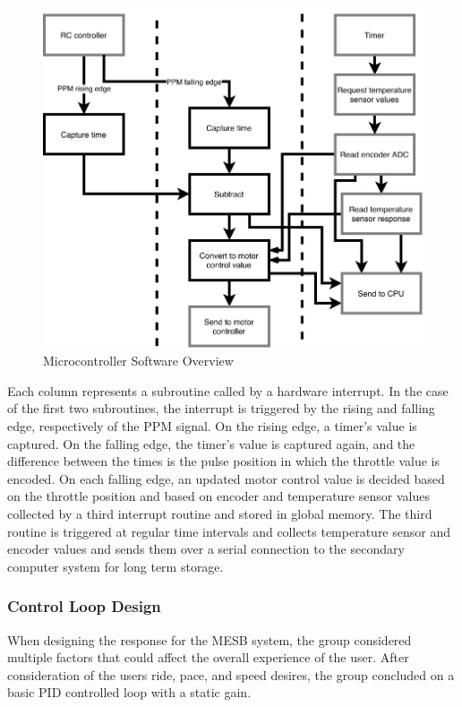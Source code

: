 \documentclass[letterpaper,12pt]{article}
\begin{document}
\begin{figure}[!htbp]\centering
\includegraphics{mcusoftware.pdf}
\caption{Microcontroller Software Overview}
\label{mcu-sw}
\end{figure}

Each column represents a subroutine called by a hardware interrupt. In the case of the first two subroutines, the interrupt is triggered by the rising and falling edge, respectively of the PPM signal. On  the rising edge, a timer's value is captured. On the falling edge, the timer's value is captured again, and the difference between the times is the pulse position in which the throttle value is encoded. On each falling edge, an updated motor control value is decided based on the throttle position and based on encoder and temperature sensor values collected by a third interrupt routine and stored in global memory. The third routine is triggered at regular time intervals and collects temperature sensor and encoder values and sends them over a serial connection to the secondary computer system for long term storage.

\subsubsection{Control Loop Design}
When designing the response for the MESB system, the group considered multiple factors that could affect the overall experience of the user. After consideration of the users ride, pace, and speed desires, the group concluded on a basic PID controlled loop with a static gain.
\end{document}
